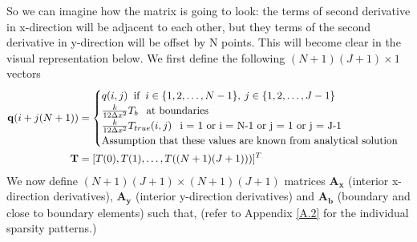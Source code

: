 \documentclass[12 pt, final]{article}
\begin{document}
\begin{itemize}
\begin{itemize}
\begin{enumerate}
                So we can imagine how the matrix is going to look: the terms of second derivative in x-direction will be adjacent to each other, but they terms of the second derivative in y-direction will be offset by N points. This will become clear in the visual representation below.
                We first define the following $(N+1)(J+1) \times 1$ vectors
                \begin{align*}
                    \mathbf{q}(i+j(N+1)) &= \begin{cases}
                    q(i,j) \:\text{ if }\: i \in \{1,2,\hdots,N-1\},\: j \in \{1,2,\hdots,J-1\}\\
                    \frac{k}{12\Delta x^2} T_b \:\:\text{ at boundaries}\\
                \frac{k}{12\Delta x^2} T_{true}(i,j) \:\:\text{ i = 1 \text{or} i = N-1 \text{or} j = 1 \text{or} j = J-1 } \\
                \text{Assumption that these values are known from analytical solution}
                    \end{cases}\\
                    \mathbf{T} &= [T(0) ,T(1),\hdots, T((N+1)(J+1)))]^T
                \end{align*}
            We now define $(N+1)(J+1)\times(N+1)(J+1)$ matrices $\mathbf{A_x}$ (interior x-direction derivatives), $\mathbf{A_y}$ (interior y-direction derivatives) and $\mathbf{A_b}$ (boundary and close to boundary elements) such that, (refer to Appendix \ref{A.2} for the individual sparsity patterns.)
            

\end{enumerate}
\end{itemize}
\end{itemize}
\end{document}
